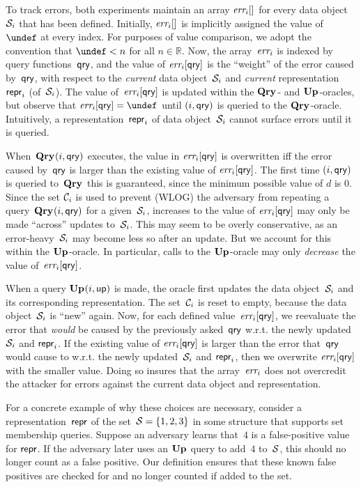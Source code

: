 To track errors, both experiments maintain an array $\textit{err}_i[]$ for every data object~$\mathcal{S}_i$ that has been defined.   Initially, $\textit{err}_i[]$ is implicitly assigned the value of~$\undef$ at every index.  For purposes of value comparison, we adopt the convention that $\undef < n$ for all $n \in \mathbb{R}$.
%
Now, the array~$\textit{err}_i$ is indexed by query functions~$\mathsf{qry}$, and the value of $\textit{err}_i[\mathsf{qry}]$ is the ``weight'' of the error caused by~$\mathsf{qry}$, with respect to the \emph{current} data object~$\mathcal{S}_i$ and \emph{current} representation~$\mathsf{repr}_i$ (of~$\mathcal{S}_i$).  
%
The value of~$\textit{err}_i[\mathsf{qry}]$ is updated within the $\mathbf{Qry}\hspace{0.5pt}$- and $\mathbf{Up}\hspace{0.5pt}$-oracles, but observe that $\err_i[\qry] = \undef$ until $(i,\mathsf{qry})$ is queried to the $\mathbf{Qry}\hspace{0.5pt}$-oracle.  Intuitively, a representation~$\mathsf{repr}_i$ of data object~$\mathcal{S}_i$ cannot surface errors until it is queried.

When~$\mathbf{Qry}\hspace{0.5pt}(i,\mathsf{qry})$ executes, the value in $\textit{err}_i[\mathsf{qry}]$ is overwritten iff the error caused by~$\mathsf{qry}$ is larger than the existing value of $\textit{err}_i[\mathsf{qry}]$.  The first time $(i,\mathsf{qry})$ is queried to~$\mathbf{Qry}\hspace{0.5pt}$ this is guaranteed, since the minimum possible value of $d$ is 0.  Since the set $\mathcal{C}_i$ is used to prevent (WLOG) the adversary from repeating a query~$\mathbf{Qry}\hspace{0.5pt}(i,\mathsf{qry})$ for a given~$\mathcal{S}_i$, increases to the value of $\textit{err}_i[\mathsf{qry}]$ may only be made ``across'' updates to~$\mathcal{S}_i$.  This may seem to be overly conservative, as an error-heavy~$\mathcal{S}_i$ may become less so after an update.  But we account for this within the $\mathbf{Up}\hspace{0.5pt}$-oracle.
In particular, calls to the $\mathbf{Up}\hspace{0.5pt}$-oracle may only \emph{decrease} the value of~$\textit{err}_i[\mathsf{qry}]$.  

When a query $\mathbf{Up}\hspace{0.5pt}(i,\mathsf{up})$ is made, the oracle first updates the data object~$\mathcal{S}_i$ and its corresponding representation.  The set~$\mathcal{C}_i$ is reset to empty, because the data object~$\mathcal{S}_i$ is ``new'' again.
%
Now, for each defined value~$\textit{err}_i[\mathsf{qry}]$, we reevaluate the error that \emph{would} be caused by the previously asked~$\mathsf{qry}$ w.r.t. the newly updated $\mathcal{S}_i$ and $\mathsf{repr}_i$.  If the existing value of $\textit{err}_i[\mathsf{qry}]$ is larger than the error that~$\mathsf{qry}$ would cause to w.r.t. the newly updated~$\mathcal{S}_i$ and $\mathsf{repr}_i$, then we overwrite $\textit{err}_i[\mathsf{qry}]$ with the smaller value.  Doing so insures that the array~$\textit{err}_i$ does not overcredit the attacker for errors against the current data object and representation.

For a concrete example of why these choices are necessary, consider a representation~$\mathsf{repr}$ of the set~$\mathcal{S} = \{1,2,3\}$ in some structure that supports set membership queries. Suppose an adversary learns that~$4$ is a false-positive value for $\mathsf{repr}$. If the adversary later uses an $\mathbf{Up}\hspace{0.5pt}$ query to add~$4$ to~$\mathcal{S}$, this should no longer count as a false positive. Our definition ensures that these known false positives are checked for and no longer counted if added to the set.

